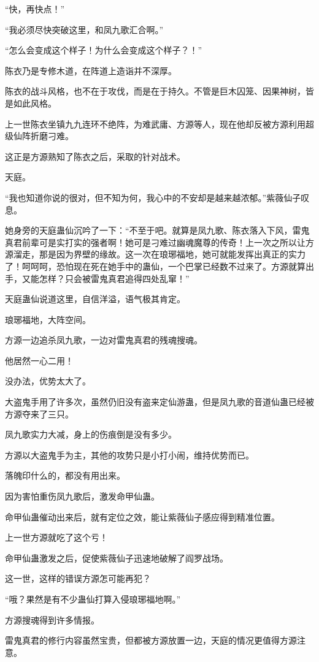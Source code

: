\begin{this_body}
“快，再快点！”

“我必须尽快突破这里，和凤九歌汇合啊。”

“怎么会变成这个样子！为什么会变成这个样子？！”

陈衣乃是专修木道，在阵道上造诣并不深厚。

陈衣的战斗风格，也不在于攻伐，而是在于持久。不管是巨木囚笼、因果神树，皆是如此风格。

上一世陈衣坐镇九九连环不绝阵，为难武庸、方源等人，现在他却反被方源利用超级仙阵折磨刁难。

这正是方源熟知了陈衣之后，采取的针对战术。

天庭。

“我也知道你说的很对，但不知为何，我心中的不安却是越来越浓郁。”紫薇仙子叹息。

她身旁的天庭蛊仙沉吟了一下：“不至于吧。就算是凤九歌、陈衣落入下风，雷鬼真君前辈可是实打实的强者啊！她可是刁难过幽魂魔尊的传奇！上一次之所以让方源溜走，那是因为界壁的缘故。这一次在琅琊福地，她可就能发挥出真正的实力了！呵呵呵，恐怕现在死在她手中的蛊仙，一个巴掌已经数不过来了。方源就算出手，又能怎样？只会被雷鬼真君追得四处乱窜！”

天庭蛊仙说道这里，自信洋溢，语气极其肯定。

琅琊福地，大阵空间。

方源一边追杀凤九歌，一边对雷鬼真君的残魂搜魂。

他居然一心二用！

没办法，优势太大了。

大盗鬼手用了许多次，虽然仍旧没有盗来定仙游蛊，但是凤九歌的音道仙蛊已经被方源夺来了三只。

凤九歌实力大减，身上的伤痕倒是没有多少。

方源以大盗鬼手为主，其他的攻势只是小打小闹，维持优势而已。

落魄印什么的，都没有用出来。

因为害怕重伤凤九歌后，激发命甲仙蛊。

命甲仙蛊催动出来后，就有定位之效，能让紫薇仙子感应得到精准位置。

上一世方源就吃了这个亏！

命甲仙蛊激发之后，促使紫薇仙子迅速地破解了阎罗战场。

这一世，这样的错误方源怎可能再犯？

“哦？果然是有不少蛊仙打算入侵琅琊福地啊。”

方源搜魂得到许多情报。

雷鬼真君的修行内容虽然宝贵，但都被方源放置一边，天庭的情况更值得方源注意。


\end{this_body}
